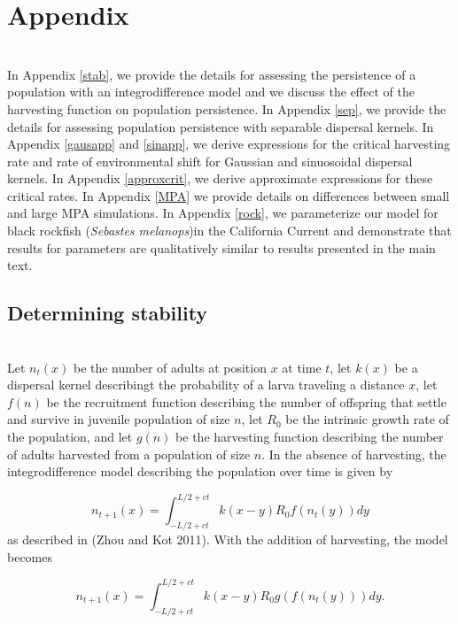 \documentclass[12pt,english]{article}
\begin{document}
 \renewcommand{\thesubsection}{\Alph{subsection}}

\section*{Appendix}
~\\In Appendix \ref{stab}, we provide the details for assessing the persistence of a population with an integrodifference model and we discuss the effect of the harvesting function on population persistence.  In Appendix \ref{sep}, we provide the details for assessing population persistence with separable dispersal kernels.  In Appendix \ref{gausapp} and \ref{sinapp}, we derive expressions for the critical harvesting rate and rate of environmental shift for Gaussian and sinuosoidal dispersal kernels.  In Appendix \ref{approxcrit}, we derive approximate expressions for these critical rates. In Appendix \ref{MPA} we provide details on differences between small and large MPA simulations. In Appendix \ref{rock}, we parameterize our model for black rockfish (\emph{Sebastes melanops})in the California Current and demonstrate that results for  parameters  are qualitatively similar to results  presented in the main text. 


\subsection{Determining stability \label{stab}}
~\\Let $n_t(x)$ be the number of adults at position $x$ at time $t$, let $k(x)$ be a dispersal kernel describingt the probability of a larva traveling a distance $x$, let $f(n)$ be the recruitment function describing the number of offspring that settle and survive in juvenile population of size $n$, let $R_0$ be the intrinsic growth rate of the population, and let $g(n)$ be the harvesting function describing the number of adults harvested from a population of size $n$.  In the absence of harvesting, the integrodifference model describing the population over time is given by 

\begin{equation} n_{t+1}(x)=\int_{-L/2+ct}^{L/2+ct}k(x-y)R_0f(n_t(y))dy \label{integro} \end{equation}
as described in (Zhou and Kot 2011).  With the addition of harvesting, the model becomes

\begin{equation} n_{t+1}(x)=\int_{-L/2+ct}^{L/2+ct}k(x-y)R_0g(f(n_t(y)))dy. \label{integro} \end{equation}
\end{document}
